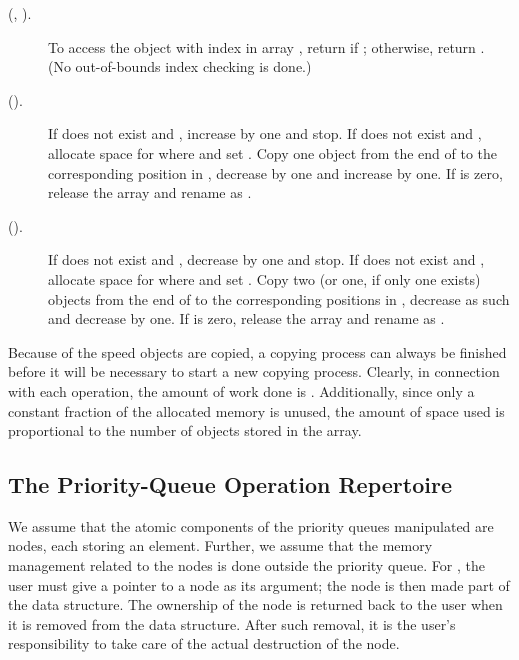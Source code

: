 \documentclass{llncs}
\newcommand{\Insert}{\mbox{}}
\newcommand{\Access}{\mbox{}}
\newcommand{\Grow}{\mbox{}}
\newcommand{\Shrink}{\mbox{}}
\begin{document}
\begin{description}
\item[\Access{}(, ).] To access the object with index  in
  array , return  if ;
  otherwise, return . (No out-of-bounds index checking is done.)

\item[\Grow{}().] 
  If  does not exist and , 
  increase  by one and stop. 
  If  does not exist and , allocate space 
  for  where 
  and set .   
  Copy one object from the end of  to the corresponding position in , 
  decrease  by one and increase  by one. 
  If  is zero, release the array  and rename  as .

\item[\Shrink{}().] 
  If  does not exist and , 
  decrease  by one and stop. 
  If  does not exist and , 
  allocate space for  where 
  and set . 
  Copy two (or one, if only one exists) objects from the end of  to the corresponding positions in ,
  decrease  as such and decrease  by one. 
  If  is zero, release the array  and rename  as .
\end{description}

Because of the speed objects are copied, a copying process can always
be finished before it will be necessary to start a new copying
process.  Clearly, in connection with each operation, the amount of
work done is . Additionally, since only a constant fraction of
the allocated memory is unused, the amount of space used is
proportional to the number of objects stored in the array.


\subsection{The Priority-Queue Operation Repertoire}

We assume that the atomic components of the priority queues manipulated are
nodes, each storing an element. Further, we assume that the memory
management related to the nodes is done outside the priority queue. For
\Insert{}, the user must give a pointer to a node as its argument; the
node is then made part of the data structure. The ownership of the
node is returned back to the user when it is removed from the data
structure. After such removal, it is the user's responsibility to take
care of the actual destruction of the node.
\end{document}
